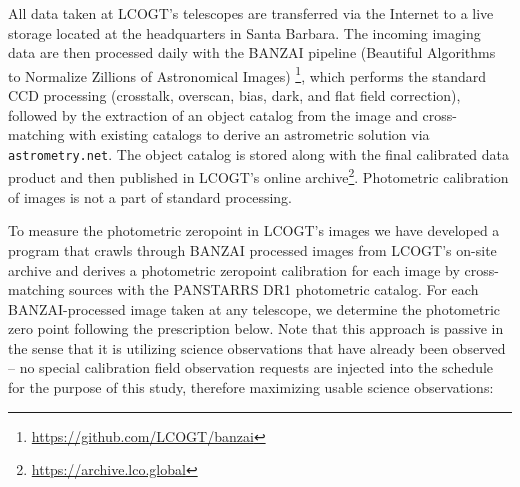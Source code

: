 \documentclass[]{spieman}
\begin{document}
All data taken at LCOGT's telescopes are transferred via the Internet to a live storage located at
the headquarters in Santa Barbara. The incoming imaging data are then processed daily with the BANZAI
pipeline (Beautiful Algorithms to Normalize Zillions of Astronomical Images)
\cite{mccully2018}\footnote{\url{https://github.com/LCOGT/banzai}}, which  performs the standard
CCD processing (crosstalk, overscan, bias, dark, and flat field correction), followed by the
extraction of an object catalog from the image and cross-matching with existing catalogs to derive an
astrometric solution via {\tt astrometry.net}\cite{lang2010}. The object catalog is stored along
with the final calibrated data product and then published in LCOGT's online
archive\footnote{\url{https://archive.lco.global}}. Photometric calibration of images is not a part
of standard processing.

To measure the photometric zeropoint in LCOGT's images we have developed a program that crawls
through BANZAI processed images from LCOGT's on-site archive and derives a photometric zeropoint
calibration for each image by cross-matching sources with the PANSTARRS DR1 photometric
catalog\cite{chambers2016}. For each BANZAI-processed image taken at any telescope, we determine the
photometric zero point following the prescription below. Note that this approach is passive in the
sense that it is utilizing science observations that have already been observed -- no special
calibration field observation requests are injected into the schedule for the purpose of this
study, therefore maximizing usable science observations:
\end{document}
